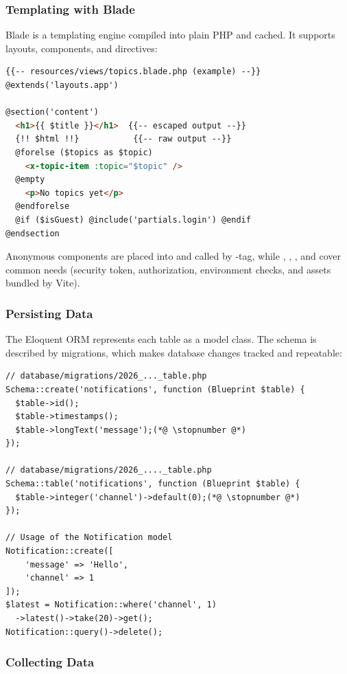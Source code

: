 \subsubsection{Templating with Blade}

Blade is a templating engine compiled into plain PHP and cached. It supports layouts,
components, and directives:

\begin{lstlisting}[language=HTML]
{{-- resources/views/topics.blade.php (example) --}}
@extends('layouts.app')

@section('content')
  <h1>{{ $title }}</h1>  {{-- escaped output --}}
  {!! $html !!}           {{-- raw output --}}
  @forelse ($topics as $topic)
    <x-topic-item :topic="$topic" />
  @empty
    <p>No topics yet</p>
  @endforelse
  @if ($isGuest) @include('partials.login') @endif
@endsection
\end{lstlisting}

\noindent Anonymous components are placed into  and called by
-tag, while , , , and  cover common needs
(security token, authorization, environment checks, and assets bundled by Vite).


\subsubsection{Persisting Data}

The Eloquent ORM represents each table as a model class. The schema is described by migrations,
which makes database changes tracked and repeatable:

\begin{lstlisting}
// database/migrations/2026_..._table.php
Schema::create('notifications', function (Blueprint $table) {
  $table->id();
  $table->timestamps();
  $table->longText('message');(*@ \stopnumber @*)
});

// database/migrations/2026_...._table.php
Schema::table('notifications', function (Blueprint $table) {
  $table->integer('channel')->default(0);(*@ \stopnumber @*)
});

// Usage of the Notification model
Notification::create([
    'message' => 'Hello',
    'channel' => 1
]);
$latest = Notification::where('channel', 1)
  ->latest()->take(20)->get();
Notification::query()->delete();
\end{lstlisting}


\subsubsection{Collecting Data}

